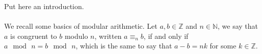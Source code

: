 
Put here an introduction.
\\\\
We recall some basics of modular arithmetic. Let $a,b\in\mathbb{Z}$
and $n\in\mathbb{N}$, we say that $a$ is congruent to $b$ modulo $n$,
written $a \equiv_{n} b$, if and only if $a\mod\,n = b\mod\,n$,
which is the same to say that $a - b = nk$ for some $k\in\mathbb{Z}$.
